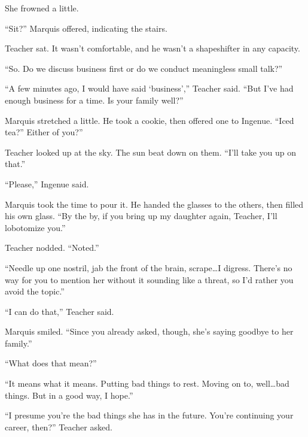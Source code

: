 She frowned a little.



``Sit?'' Marquis offered, indicating the stairs.



Teacher sat.  It wasn't comfortable, and he wasn't a shapeshifter in any capacity.



``So.  Do we discuss business first or do we conduct meaningless small talk?''



``A few minutes ago, I would have said `business','' Teacher said.  ``But I've had enough business for a time.  Is your family well?''



Marquis stretched a little.  He took a cookie, then offered one to Ingenue.  ``Iced tea?''  Either of you?''



Teacher looked up at the sky.  The sun beat down on them.  ``I'll take you up on that.''



``Please,'' Ingenue said.



Marquis took the time to pour it.  He handed the glasses to the others, then filled his own glass.  ``By the by, if you bring up my daughter again, Teacher, I'll lobotomize you.''



Teacher nodded.  ``Noted.''



``Needle up one nostril, jab the front of the brain, scrape\ldots I digress.  There's no way for you to mention her without it sounding like a threat, so I'd rather you avoid the topic.''



``I can do that,'' Teacher said.



Marquis smiled.  ``Since you already asked, though, she's saying goodbye to her family.''



``What does that mean?''



``It means what it means.  Putting bad things to rest.  Moving on to, well\ldots bad things.  But in a good way, I hope.''



``I presume you're the bad things she has in the future.  You're continuing your career, then?''  Teacher asked.



